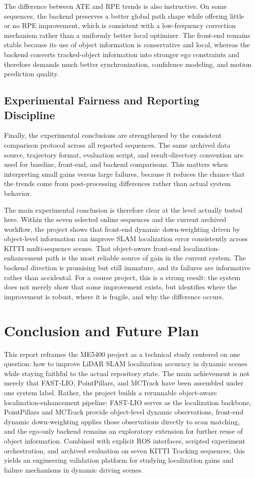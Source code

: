 \documentclass[a4paper,12pt]{article}
\begin{document}
The difference between ATE and RPE trends is also instructive. On some sequences, the backend preserves a better global path shape while offering little or no RPE improvement, which is consistent with a low-frequency correction mechanism rather than a uniformly better local optimizer. The front-end remains stable because its use of object information is conservative and local, whereas the backend converts tracked-object information into stronger ego constraints and therefore demands much better synchronization, confidence modeling, and motion prediction quality.

\subsection{Experimental Fairness and Reporting Discipline}
Finally, the experimental conclusions are strengthened by the consistent comparison protocol across all reported sequences. The same archived data source, trajectory format, evaluation script, and result-directory convention are used for baseline, front-end, and backend comparisons. This matters when interpreting small gains versus large failures, because it reduces the chance that the trends come from post-processing differences rather than actual system behavior.

The main experimental conclusion is therefore clear at the level actually tested here. Within the seven selected online sequences and the current archived workflow, the project shows that front-end dynamic down-weighting driven by object-level information can improve SLAM localization error consistently across KITTI multi-sequence scenes. That object-aware front-end localization-enhancement path is the most reliable source of gain in the current system. The backend direction is promising but still immature, and its failures are informative rather than accidental. For a course project, this is a strong result: the system does not merely show that some improvement exists, but identifies where the improvement is robust, where it is fragile, and why the difference occurs.

\section{Conclusion and Future Plan}
This report reframes the ME5400 project as a technical study centered on one question: how to improve LiDAR SLAM localization accuracy in dynamic scenes while staying faithful to the actual repository state. The main achievement is not merely that FAST-LIO, PointPillars, and MCTrack have been assembled under one system label. Rather, the project builds a rerunnable object-aware localization-enhancement pipeline: FAST-LIO serves as the localization backbone, PointPillars and MCTrack provide object-level dynamic observations, front-end dynamic down-weighting applies those observations directly to scan matching, and the ego-only backend remains an exploratory extension for further reuse of object information. Combined with explicit ROS interfaces, scripted experiment orchestration, and archived evaluation on seven KITTI Tracking sequences, this yields an engineering validation platform for studying localization gains and failure mechanisms in dynamic driving scenes.
\end{document}
